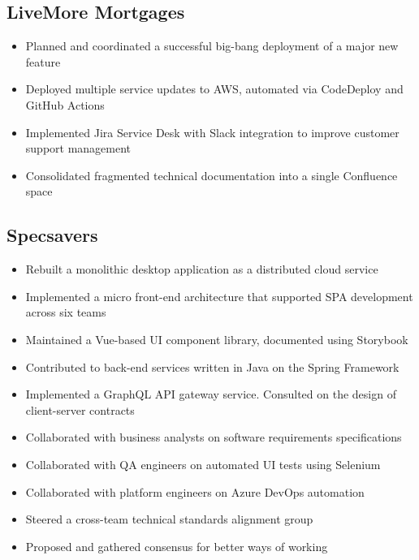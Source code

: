 \documentclass[a4paper,10pt]{article}
\begin{document}

\subsection*{LiveMore Mortgages \hfill {}}
\begin{itemize}
  \item Planned and coordinated a successful big-bang deployment of a major new feature
  \item Deployed multiple service updates to AWS, automated via CodeDeploy and GitHub Actions
  \item Implemented Jira Service Desk with Slack integration to improve customer support management
  \item Consolidated fragmented technical documentation into a single Confluence space
\end{itemize}

\subsection*{Specsavers \hfill {}}
\begin{itemize}
  \item Rebuilt a monolithic desktop application as a distributed cloud service
  \item Implemented a micro front-end architecture that supported SPA development across six teams
  \item Maintained a Vue-based UI component library, documented using Storybook
  \item Contributed to back-end services written in Java on the Spring Framework
  \item Implemented a GraphQL API gateway service. Consulted on the design of client-server contracts
  \item Collaborated with business analysts on software requirements specifications
  \item Collaborated with QA engineers on automated UI tests using Selenium
  \item Collaborated with platform engineers on Azure DevOps automation
  \item Steered a cross-team technical standards alignment group
  \item Proposed and gathered consensus for better ways of working
\end{itemize}
\end{document}

